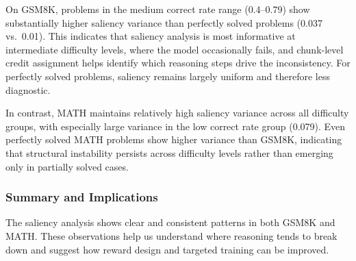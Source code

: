 \documentclass[12pt]{report}
\begin{document}
On GSM8K, problems in the medium correct rate range (0.4--0.79)
show substantially higher saliency variance than perfectly solved
problems (0.037 vs.\ 0.01). This indicates that saliency analysis is
most informative at intermediate difficulty levels, where the model
occasionally fails, and chunk-level credit assignment helps identify
which reasoning steps drive the inconsistency. For perfectly solved
problems, saliency remains largely uniform and therefore less diagnostic.

In contrast, MATH maintains relatively high saliency variance across all
difficulty groups, with especially large variance in the low correct rate
group (0.079). Even perfectly solved MATH problems show higher variance than GSM8K,
indicating that structural instability persists across difficulty levels
rather than emerging only in partially solved cases.


\subsubsection{Summary and Implications}
\label{sec:saliency-summary}

The saliency analysis shows clear and consistent patterns in
both GSM8K and MATH. These observations help us understand where
reasoning tends to break down and suggest how reward design and
targeted training can be improved.
\end{document}
